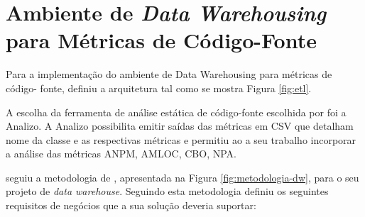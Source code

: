 \section{Ambiente de \textit{Data Warehousing} para Métricas de Código-Fonte}


Para a implementação do ambiente de Data Warehousing para métricas de código-
fonte,  definiu a arquitetura tal como se mostra Figura \ref{fig:etl}.

A escolha da ferramenta de análise estática de código-fonte escolhida por  foi a Analizo. A Analizo  possibilita emitir saídas das métricas em CSV que detalham nome da classe e as respectivas métricas e permitiu ao a seu trabalho incorporar a análise das métricas ANPM, AMLOC, CBO, NPA.

 seguiu a metodologia de \cite{Kimball2002}, apresentada na Figura \ref{fig:metodologia-dw}, para o seu projeto de \textit{data warehouse}. Seguindo esta metodologia  definiu os seguintes requisitos de negócios que a sua solução deveria suportar:

